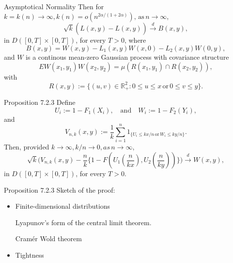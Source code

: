 \documentclass[11pt]{beamer}
\begin{document}
\begin{frame}{Asymptotical Normality}
Then for $k=k(n)\to \infty, k(n)=o(n^{2\alpha/(1+2\alpha)}), \, \text{as} \, n\to \infty$,
\begin{displaymath}
\sqrt{k}(\hat{L}(x,y)-L(x,y))\stackrel{d}{\to } B(x,y),
\end{displaymath}
in $D([0,T]\times [0,T])$, for every $T>0$, where
\begin{displaymath}
B(x,y)=W(x,y) -L_1(x,y)W(x,0)-L_2(x,y) W(0,y),
\end{displaymath}
and $W$ is a continous mean-zero Gaussian process with covariance structure
\begin{displaymath}
EW(x_1,y_1)W(x_2,y_2)=\mu(R(x_1,y_1)\cap R(x_2,y_2)),
\end{displaymath}
with 
\begin{displaymath}
R(x,y):=\{ (u,v) \in \mathbb{R}_{+}^2:0\le u\le x \, \text{or} \, 0\le v\le y\}.
\end{displaymath}
\end{frame}
\begin{frame}{Proposition 7.2.3}
Define
\begin{displaymath}
U_i:=1-F_1(X_i), \quad \text{and} \quad W_i:=1-F_2(Y_i),
\end{displaymath}
and
\begin{displaymath}
V_{n,k}(x,y):=\frac{1}{k} \sum_{i=1}^n 1_{\{ U_i\le kx/n \, \text{or} \, W_i \le ky/n\}}.
\end{displaymath}
Then, provided $k\to \infty, k/n \to 0, as\, n \to \infty$,
\begin{displaymath}
\sqrt{k}\big(V_{n,k}(x,y)-\dfrac{n}{k}\{ 1-F(U_1(\dfrac{n}{kx}), U_2(\dfrac{n}{ky})) \} \big)\stackrel{d}{\to} W(x,y),
\end{displaymath}
in $D([0,T]\times[0,T])$, for every $T>0$.                                                                                                                                                                                                    
\end{frame}
\begin{frame}{Proposition 7.2.3}
Sketch of the proof:
\begin{itemize}
\item Finite-dimensional distributions\par 
\quad Lyapunov's form of the central limit theorem.\par 
\quad Cram\'er Wold theorem 
\item Tightness                                                               
\end{itemize}
\end{frame}
\end{document}
